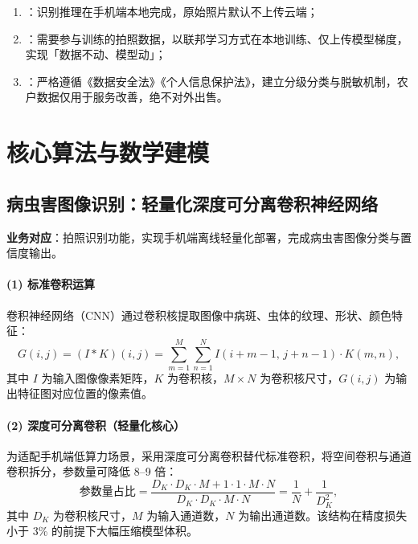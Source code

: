 \begin{enumerate}[leftmargin=1.6em]
  \item {}：识别推理在手机端本地完成，原始照片默认不上传云端；
  \item {}：需要参与训练的拍照数据，以联邦学习方式在本地训练、仅上传模型梯度，实现「数据不动、模型动」；
  \item {}：严格遵循《数据安全法》《个人信息保护法》，建立分级分类与脱敏机制，农户数据仅用于服务改善，绝不对外出售。
\end{enumerate}

\section{核心算法与数学建模}

\subsection{病虫害图像识别：轻量化深度可分离卷积神经网络}

\textbf{业务对应}：拍照识别功能，实现手机端离线轻量化部署，完成病虫害图像分类与置信度输出。

\paragraph{(1) 标准卷积运算}
卷积神经网络（CNN）通过卷积核提取图像中病斑、虫体的纹理、形状、颜色特征：
\begin{equation}
  G(i,j) = (I * K)(i,j) = \sum_{m=1}^{M}\sum_{n=1}^{N} I(i+m-1,\, j+n-1) \cdot K(m,n),
\end{equation}
其中 $I$ 为输入图像像素矩阵，$K$ 为卷积核，$M\times N$ 为卷积核尺寸，$G(i,j)$ 为输出特征图对应位置的像素值。

\paragraph{(2) 深度可分离卷积（轻量化核心）}
为适配手机端低算力场景，采用深度可分离卷积替代标准卷积，将空间卷积与通道卷积拆分，参数量可降低 8--9 倍：
\begin{equation}
  \text{参数量占比} = \frac{D_K \cdot D_K \cdot M + 1 \cdot 1 \cdot M \cdot N}{D_K \cdot D_K \cdot M \cdot N}
  = \frac{1}{N} + \frac{1}{D_K^{2}},
\end{equation}
其中 $D_K$ 为卷积核尺寸，$M$ 为输入通道数，$N$ 为输出通道数。该结构在精度损失小于 3\% 的前提下大幅压缩模型体积。

